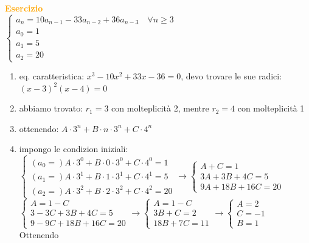 \begin{flushleft}
    \begin{boxA}
        \textcolor{orange}{\textbf{Esercizio}} \\
        $\begin{cases}
            a_n = 10a_{n-1} - 33a_{n-2} + 36a_{n-3} \quad \forall n \geq 3 \\
            a_0 = 1 \\
            a_1 = 5 \\
            a_2 = 20
        \end{cases}$
        \begin{enumerate}[nosep]
            \item eq. caratteristica: $x^3 - 10x^2 + 33x - 36 = 0$, devo trovare le sue radici: $(x-3)^2(x-4) = 0$
            \item abbiamo trovato: $r_1 = 3$ con molteplicità 2, mentre $r_2 = 4$ con molteplicità 1
            \item ottenendo: $A \cdot 3^n + B \cdot n \cdot 3^n + C \cdot 4^n$
            \item impongo le condizion iniziali: \\
            $\begin{cases}
                (a_0 =) A \cdot 3^0 + B \cdot 0 \cdot 3^0 + C \cdot 4^0 = 1 \\
                (a_1 =) A \cdot 3^1 + B \cdot 1 \cdot 3^1 + C \cdot 4^1 = 5 \\
                (a_2 =) A \cdot 3^2 + B \cdot 2 \cdot 3^2 + C \cdot 4^2 = 20
            \end{cases}
            \rightarrow
            \begin{cases}
                A + C = 1 \\
                3A + 3B + 4C = 5 \\
                9A + 18B + 16C = 20
            \end{cases}$ \\
            $\begin{cases}
                A = 1 - C \\
                3 - 3C + 3B + 4C = 5 \\
                9 - 9C + 18B + 16C = 20
            \end{cases}
            \rightarrow
            \begin{cases}
                A = 1 - C \\
                3B + C = 2 \\
                18B + 7C = 11
            \end{cases}
            \rightarrow
            \begin{cases}
                A = 2 \\
                C = -1 \\
                B = 1
            \end{cases}$ \\
            Ottenendo 
        \end{enumerate}
    \end{boxA}
    

\end{flushleft}
